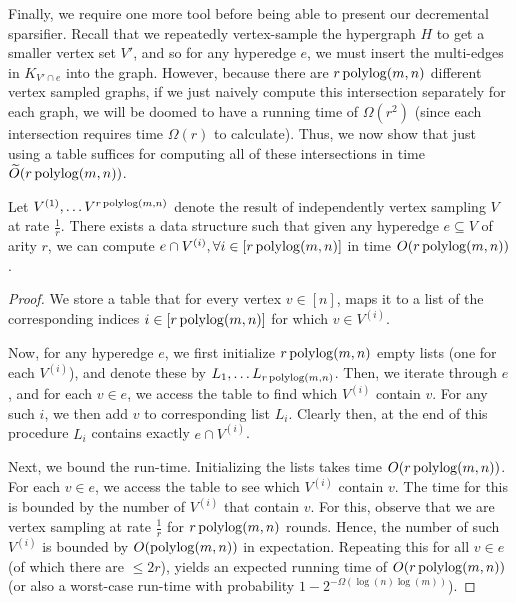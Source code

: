 \documentclass{article}
\begin{document}
Finally, we require one more tool before being able to present our decremental sparsifier. Recall that we repeatedly vertex-sample the hypergraph $H$ to get a smaller vertex set $V'$, and so for any hyperedge $e$, we must insert the multi-edges in $K_{V' \cap e}$ into the graph. However, because there are $r \operatorname{polylog}(m,n)$ different vertex sampled graphs, if we just naively compute this intersection separately for each graph, we will be doomed to have a running time of $\Omega(r^2)$ (since each intersection requires time $\Omega(r)$ to calculate). Thus, we now show that just using a table suffices for computing all of these intersections in time $\widetilde{O}(r \operatorname{polylog}(m,n))$.

\begin{claim}\label{clm:computingIntersections}
    Let $V^{(1)}, \dots V^{r \operatorname{polylog}(m,n)}$ denote the result of independently vertex sampling $V$ at rate $\frac{1}{r}$. There exists a data structure such that given any hyperedge $e \subseteq V$ of arity $r$, we can compute $e \cap V^{(i)}, \forall i \in [r\operatorname{polylog}(m,n)]$ in time $O(r \operatorname{polylog}(m,n))$.
\end{claim}

\begin{proof}
    We store a table that for every vertex $v \in [n]$, maps it to a list of the corresponding indices $i \in [r\operatorname{polylog}(m,n)]$ for which $v \in V^{(i)}$. 
    
    Now, for any hyperedge $e$, we first initialize $r\operatorname{polylog}(m,n)$ empty lists (one for each $V^{(i)}$), and denote these by $L_1, \dots L_{r\operatorname{polylog}(m,n)}$. Then, we iterate through $e$, and for each $v\in e$, we access the table to find which $V^{(i)}$ contain $v$. For any such $i$, we then add $v$ to corresponding list $L_i$. Clearly then, at the end of this procedure $L_i$ contains exactly $e \cap V^{(i)}$.

    Next, we bound the run-time. Initializing the lists takes time $O(r\operatorname{polylog}(m,n))$. For each $v \in e$, we access the table to see which $V^{(i)}$ contain $v$. The time for this is bounded by the number of $V^{(i)}$ that contain $v$. For this, observe that we are vertex sampling at rate $\frac{1}{r}$ for $r\operatorname{polylog}(m,n)$ rounds. Hence, the number of such $V^{(i)}$ is bounded by $O(\operatorname{polylog}(m,n))$ in expectation. Repeating this for all $v \in e$ (of which there are $\leq 2r$), yields an expected running time of $O(r\operatorname{polylog}(m,n))$ (or also a worst-case run-time with probability $1 - 2^{- \Omega(\log(n) \log(m))}$).
\end{proof}
\end{document}
